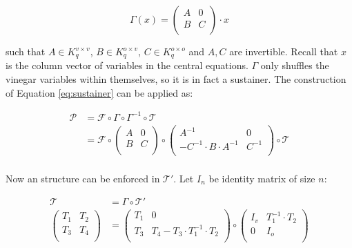 \documentclass{ufsctex/ufsctex}
\begin{document}
\begin{equation}
\Gamma(x) =
\begin{pmatrix}
A & 0 \\
B & C \\
\end{pmatrix} \cdot x
\end{equation}

such that $A \in K^{v \times v}_q$, $B \in K^{o \times v}_q$, $C \in K^{o
\times o}_q$ and $A, C$ are invertible. Recall that $x$ is the column vector of
variables in the central equations. $\Gamma$ only shuffles the vinegar
variables within themselves, so it is in fact a sustainer. The construction of
Equation \ref{eq:sustainer} can be applied as:

\begin{equation}
\begin{split}
\mathcal{P} &= \mathcal{F} \circ \Gamma \circ \Gamma^{-1} \circ \mathcal{T} \\
&=
\mathcal{F} \circ
\begin{pmatrix}
A & 0 \\
B & C \\
\end{pmatrix}
\circ
\begin{pmatrix}
A^{-1} & 0 \\
-C^{-1} \cdot B \cdot A^{-1} & C^{-1} \\
\end{pmatrix}
\circ
\mathcal{T} \\
\end{split}
\end{equation}

Now an structure can be enforced in $\mathcal{T'}$. Let $I_n$ be identity
matrix of size $n$:

\begin{equation}
\begin{split}
\mathcal{T} &= \Gamma \circ \mathcal{T'} \\
\begin{pmatrix}
T_1 & T_2 \\
T_3 & T_4 \\
\end{pmatrix}
&=
\begin{pmatrix}
T_1 & 0 \\
T_3 & T_4 - T_3 \cdot T_1^{-1} \cdot T_2 \\
\end{pmatrix}
\circ
\begin{pmatrix}
I_v & T_1^{-1} \cdot T_2 \\
0 & I_o \\
\end{pmatrix} \\
\end{split}
\end{equation}
\end{document}
